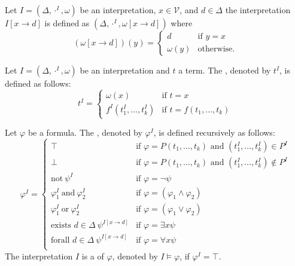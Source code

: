 Let $I=(\Delta,\cdot^I,\omega)$ be an interpretation, $x\in\mathcal{V}$, and $d\in\Delta$ the interpretation $I\left[x\to d\right]$ is defined as $(\Delta,\cdot^I,\omega\left[x\to d\right])$ where
\[(\omega\left[x\to d\right])(y)=
	\begin{cases}
		d         & \text{if $y=x$}   \\
		\omega(y) & \text{otherwise.} 
	\end{cases}\]
\begin{definition}
	Let $I=(\Delta,\cdot^I,\omega)$ be an interpretation and $t$ a term. The , denoted by $t^I$, is defined as follows:
	\[t^I=
		\begin{cases}
			\omega(x)              & \text{if $t=x$}                \\
			f^I(t^I_1,\dots,t^I_k) & \text{if $t=f(t_1,\dots,t_k)$} 
		\end{cases}\]
		
	Let $\varphi$ be a formula. The , denoted by $\varphi^I$, is defined recursively as follows:
	\[\varphi^I=
		\begin{cases}
			\top                                                   & \text{if $\varphi=P(t_1,\dots,t_k)$ and $(t^I_1,\dots,t^I_k)\in P^I$}    \\
			\bot                                                   & \text{if $\varphi=P(t_1,\dots,t_k)$ and $(t^I_1,\dots,t^I_k)\notin P^I$} \\
			\text{not}~\psi^I                                      & \text{if $\varphi=\neg\psi$}                                             \\
			\varphi^I_1~\text{and}~\varphi^I_2                     & \text{if $\varphi=(\varphi_1\wedge\varphi_2)$}                           \\
			\varphi^I_1~\text{or}~\varphi^I_2                      & \text{if $\varphi=(\varphi_1\vee\varphi_2)$}                             \\
			\text{exists $d\in\Delta$}~\psi^{I\left[x\to d\right]} & \text{if $\varphi=\exists x\psi$}                                        \\
			\text{forall $d\in\Delta$}~\psi^{I\left[x\to d\right]} & \text{if $\varphi=\forall x\psi$}                                        \\
		\end{cases}\]
	The interpretation $I$ is a  of $\varphi$, denoted by $I\models\varphi$, if $\varphi^I=\top$.
\end{definition}
